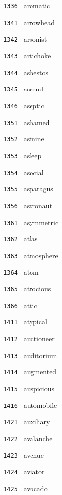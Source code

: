 \documentclass[11pt]{article}
\begin{document}
\begin{multicols}{6}
\noindent \texttt{ 1336 } aromatic  \par
\vspace{3mm}
\noindent \texttt{ 1341 } arrowhead  \par
\noindent \texttt{ 1342 } arsonist  \par
\noindent \texttt{ 1343 } artichoke  \par
\noindent \texttt{ 1344 } asbestos  \par
\noindent \texttt{ 1345 } ascend  \par
\noindent \texttt{ 1346 } aseptic  \par
\vspace{3mm}
\noindent \texttt{ 1351 } ashamed  \par
\noindent \texttt{ 1352 } asinine  \par
\noindent \texttt{ 1353 } asleep  \par
\noindent \texttt{ 1354 } asocial  \par
\noindent \texttt{ 1355 } asparagus  \par
\noindent \texttt{ 1356 } astronaut  \par
\vspace{3mm}
\noindent \texttt{ 1361 } asymmetric  \par
\noindent \texttt{ 1362 } atlas  \par
\noindent \texttt{ 1363 } atmosphere  \par
\noindent \texttt{ 1364 } atom  \par
\noindent \texttt{ 1365 } atrocious  \par
\noindent \texttt{ 1366 } attic  \par
\noindent \texttt{ 1411 } atypical  \par
\noindent \texttt{ 1412 } auctioneer  \par
\noindent \texttt{ 1413 } auditorium  \par
\noindent \texttt{ 1414 } augmented  \par
\noindent \texttt{ 1415 } auspicious  \par
\noindent \texttt{ 1416 } automobile  \par
\vspace{3mm}
\noindent \texttt{ 1421 } auxiliary  \par
\noindent \texttt{ 1422 } avalanche  \par
\noindent \texttt{ 1423 } avenue  \par
\noindent \texttt{ 1424 } aviator  \par
\noindent \texttt{ 1425 } avocado  \par

\end{multicols}
\end{document}

